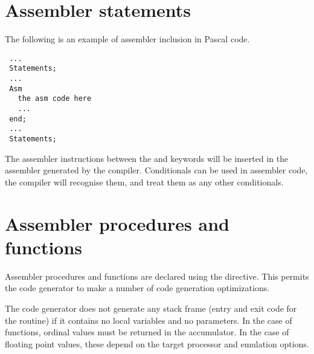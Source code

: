 \section{Assembler statements }
  
The following is an example of assembler inclusion in Pascal code.
\begin{verbatim}
 ...
 Statements;
 ...
 Asm
   the asm code here
   ...
 end;
 ...
 Statements;
\end{verbatim}
The assembler instructions between the  and  keywords will
be inserted in the assembler generated by the compiler.
Conditionals can be used in assembler code, the compiler will recognise them,
and treat them as any other conditionals.

\section{Assembler procedures and functions}
  
Assembler procedures and functions are declared using the
 directive.  This permits the code generator to make a number
of code generation optimizations.

The code generator does not generate any stack frame (entry and exit
code for the routine) if it contains no local variables and no
parameters. In the case of functions, ordinal values must be returned
in the accumulator. In the case of floating point values, these depend
on the target processor and emulation options.


%
%
\printindex

